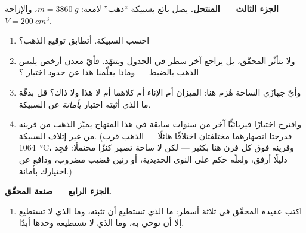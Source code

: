 \begin{problem}
\medskip\noindent\textbf{الجزء الثالث --- المنتحل.}
يصل بائع بسبيكة ``ذهب'' لامعة: $m = \qty{3860}{g}$،
والإزاحة $V = \qty{200}{cm^3}$.
\begin{enumerate}[resume]
  \item احسب  السبيكة. أتطابق توقيع الذهب؟
  \item ولا يتأثّر المحقّق، بل يراجع آخر سطر في الجدول ويتنهّد.
        فأيّ معدن أرخص يلبس  الذهب بالضبط --- وماذا
        يعلّمنا هذا عن حدود اختبار ؟
  \item وأيّ جهازَي الساحة هُزم هنا: الميزان أم الإناء أم
        كلاهما أم لا هذا ولا ذاك؟ قل بدقّة ما الذي أثبته
        اختبار  \emph{بأمانة} عن السبيكة.
  \item واقترح اختبارًا فيزيائيًّا آخر من سنوات سابقة في هذا
        المنهاج يميّز الذهب من قرينه من غير إتلاف السبيكة.
        (فدرجتا انصهارهما مختلفتان اختلافًا هائلًا --- الذهب
        قرب \qty{1064}{\celsius}، وقرينه فوق كل فرن هنا بكثير
        --- لكن لا ساحة تصهر كنزًا محتملًا: فجِد دليلًا أرفق،
        ولعلّه حكم  على النوى الحديدية، أو رنين قضيب
        مضروب، ودافع عن اختيارك بأمانة.)
\end{enumerate}

\medskip\noindent\textbf{الجزء الرابع --- صنعة المحقّق.}
\begin{enumerate}[resume]
  \item اكتب عقيدة المحقّق في ثلاثة أسطر: ما الذي تستطيع
         أن تثبته، وما الذي لا تستطيع إلا أن توحي به،
        وما الذي لا تستطيعه وحدها أبدًا.
\end{enumerate}
\end{problem}
